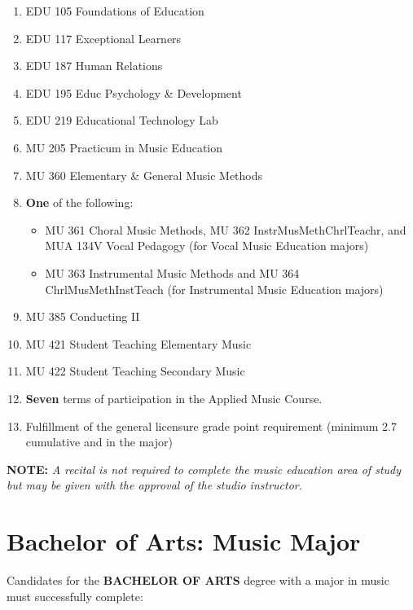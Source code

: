 \documentclass[
  letterpaper,
]{scrbook}
\providecommand{\tightlist}{%
  \setlength{\itemsep}{0pt}\setlength{\parskip}{0pt}}
\begin{document}
\begin{enumerate}
  \begin{enumerate}
  \def\labelenumii{\arabic{enumii}.}
  \tightlist
  \item
    EDU 105 Foundations of Education
  \item
    EDU 117 Exceptional Learners
  \item
    EDU 187 Human Relations
  \item
    EDU 195 Educ Psychology \& Development
  \item
    EDU 219 Educational Technology Lab
  \item
    MU 205 Practicum in Music Education
  \item
    MU 360 Elementary \& General Music Methods
  \item
    \textbf{One} of the following:

    \begin{itemize}
    \tightlist
    \item
      MU 361 Choral Music Methods, MU 362 InstrMusMethChrlTeachr, and
      MUA 134V Vocal Pedagogy (for Vocal Music Education majors)
    \item
      MU 363 Instrumental Music Methods and MU 364 ChrlMusMethInstTeach
      (for Instrumental Music Education majors)
    \end{itemize}
  \item
    MU 385 Conducting II
  \item
    MU 421 Student Teaching Elementary Music
  \item
    MU 422 Student Teaching Secondary Music
  \item
    \textbf{Seven} terms of participation in the Applied Music Course.
  \item
    Fulfillment of the general licensure grade point requirement
    (minimum 2.7 cumulative and in the major)
  \end{enumerate}
\end{enumerate}

\textbf{NOTE:} \emph{A recital is not required to complete the music
education area of study but may be given with the approval of the studio
instructor. }

\section{Bachelor of Arts: Music
Major}\label{bachelor-of-arts-music-major}

Candidates for the \textbf{BACHELOR OF ARTS} degree with a major in
music must successfully complete:
\end{document}
